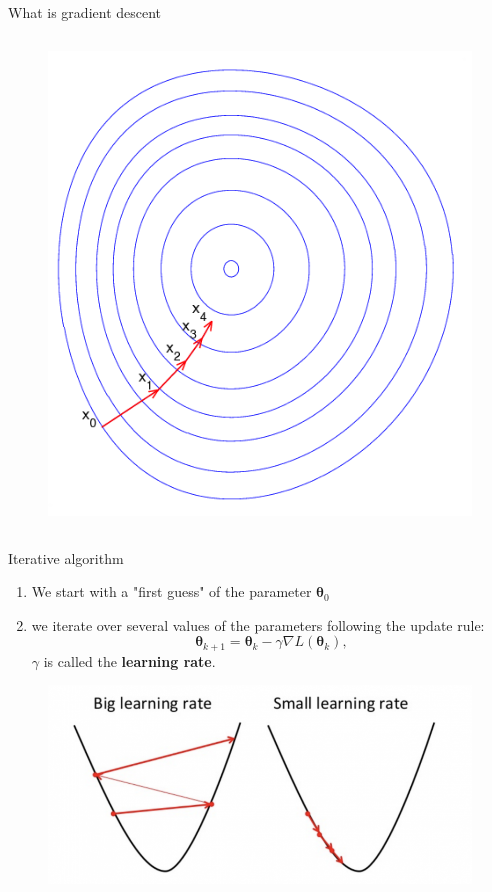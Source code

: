 \documentclass[handout]{beamer}
\begin{document}
\begin{frame}{What is gradient descent}
\begin{columns}
\begin{figure}
    \centering
    \includegraphics[width=.8\textwidth]{fig/L3/gradient-descent-range.png}
\end{figure}
\end{columns}

\end{frame}
 \begin{frame}{Iterative algorithm}
  \begin{enumerate}[<+->]
      \item We start with a "first guess" of the parameter $\boldsymbol{\theta}_0$
      \item we iterate over several values of the parameters following the update rule:
      $$
      \boldsymbol{\theta}_{k+1} = \boldsymbol{\theta}_{k} - \gamma \nabla L(\boldsymbol{\theta}_{k}),
      $$
      $\gamma$ is called the \alert{\bf learning rate}.
  \end{enumerate}   
  \pause
  \begin{figure}
    \centering
    \includegraphics[width=.8\textwidth]{fig/L3/gradient-descent-learning-rate.png}
\end{figure}
 \end{frame}
\end{document}
